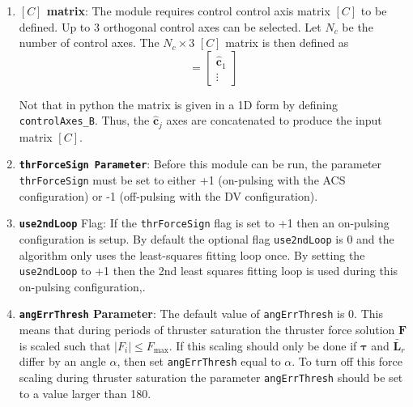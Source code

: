 \begin{enumerate}
\item \textbf{$[C]$ matrix}: The module requires control control axis matrix $[C]$ to be defined.  Up to 3 orthogonal control axes can be selected.  Let $N_{c}$ be the number of control axes.  The $N_{c}\times 3$ $[C]$ matrix is then defined as
\begin{equation}
	[C] = \begin{bmatrix}
		\hat{\bm c}_{1}
		\\
		\vdots
	\end{bmatrix}
\end{equation}

Not that in python the matrix is given in a 1D form by defining {\tt controlAxes\_B}.  Thus, the $\hat{\bm c}_{j}$ axes are concatenated to produce the input matrix $[C]$.

\item \textbf{\tt thrForceSign Parameter}: Before this module can be run, the parameter {\tt thrForceSign} must be set to either +1 (on-pulsing with the ACS configuration) or -1 (off-pulsing with the DV configuration).

\item \textbf{\tt use2ndLoop} Flag: If the  {\tt thrForceSign} flag is set to +1 then an on-pulsing configuration is setup.  By default the optional flag  {\tt use2ndLoop} is 0 and the algorithm  only uses the least-squares fitting loop once.  By setting the {\tt use2ndLoop} to +1 then the 2nd least squares fitting loop is used during this on-pulsing configuration,.

\item \textbf{{\tt angErrThresh} Parameter}: The default value of {\tt angErrThresh} is 0\dg.  This means that during periods of thruster saturation the thruster force solution $\bm F$ is scaled such that $|F_{i}| \le F_{\text{max}}$.  If this scaling should only be done if $\bm\tau$ and $\bar{\bm L}_{r}$ differ by an angle $\alpha$, then set {\tt angErrThresh} equal to $\alpha$.  To turn off this force scaling during thruster saturation the parameter   {\tt angErrThresh} should be set to a value larger than 180\dg.

\end{enumerate}
